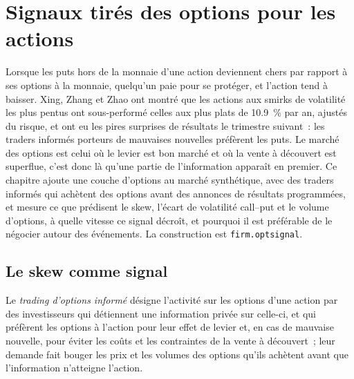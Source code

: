 \chapter{Signaux tirés des options pour les actions}\label{ch:s1:options-implied-signals-for-stocks}

Lorsque les puts hors de la monnaie d'une action deviennent chers par rapport à ses options à la monnaie, quelqu'un paie pour se protéger, et l'action tend à baisser.
Xing, Zhang et Zhao ont montré que les actions aux smirks de volatilité les plus pentus ont sous-performé celles aux plus plats de 10.9~\% par an, ajustés du risque, et ont eu
les pires surprises de résultats le trimestre suivant~: les traders informés porteurs de mauvaises nouvelles préfèrent les puts. Le marché des options est celui où le levier est bon marché et où la vente à découvert est
superflue, c'est donc là qu'une partie de l'information apparaît en premier. Ce chapitre ajoute une couche d'options au marché synthétique, avec des traders informés qui achètent des options
avant des annonces de résultats programmées, et mesure ce que prédisent le skew, l'écart de volatilité call--put et le volume d'options, à quelle vitesse ce signal décroît, et pourquoi il est préférable de le négocier
autour des événements. La construction est \texttt{firm.optsignal}.

\section{Le skew comme signal}

\begin{definition}\label{def:s1:options-implied-signals-for-stocks:informed}
Le \emph{trading d'options informé} désigne l'activité sur les options d'une action par des investisseurs qui détiennent une information privée sur celle-ci, et qui
préfèrent les options à l'action pour leur effet de levier et, en cas de mauvaise nouvelle, pour éviter les coûts et les contraintes de la vente à découvert~; leur demande fait bouger les prix et les
volumes des options qu'ils achètent avant que l'information n'atteigne l'action.
\end{definition}

